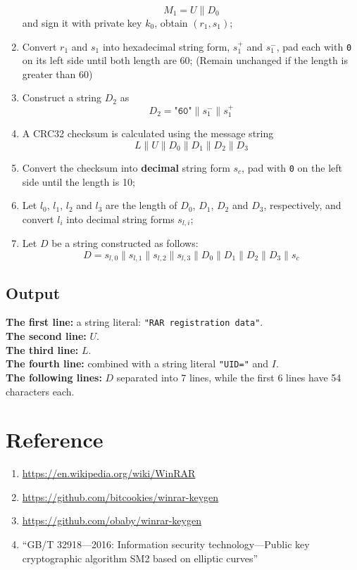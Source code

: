 \documentclass[oneside]{article}
\begin{document}
\begin{enumerate}
            \[M_1=U\parallel D_0\]
            and sign it with private key $k_0$, obtain $\left(r_1,s_1\right)$;
      \item Convert $r_1$ and $s_1$ into hexadecimal string form, $s_1^+$ and $s_1^-$, pad each with \texttt{0} on its left side until both length are 60; (Remain unchanged if the length is greater than 60)
      \item Construct a string $D_2$ as
            \[D_2=\texttt{"60"}\parallel s_1^-\parallel s_1^+\]
      \item A CRC32 checksum is calculated using the message string
            \[L\parallel U\parallel D_0\parallel D_1\parallel D_2\parallel D_3\]
      \item Convert the checksum into \textbf{decimal} string form $s_c$, pad with \texttt{0} on the left side until the length is 10;
      \item Let $l_0$, $l_1$, $l_2$ and $l_3$ are the length of $D_0$, $D_1$, $D_2$ and $D_3$, respectively, and convert $l_i$ into decimal string forms $s_{l,i}$;
      \item Let $D$ be a string constructed as follows:
            \[D=s_{l,0}\parallel s_{l,1}\parallel s_{l,2}\parallel s_{l,3}\parallel D_0\parallel D_1\parallel D_2\parallel D_3 \parallel s_c\]
\end{enumerate}

\subsection{Output}
\textbf{The first line:} a string literal: \texttt{"RAR registration data"}.\\
\textbf{The second line:} $U$.\\
\textbf{The third line:} $L$.\\
\textbf{The fourth line:} combined with a string literal \texttt{"UID="} and $I$.\\
\textbf{The following lines:} $D$ separated into 7 lines, while the first 6 lines have 54 characters each.

\section*{Reference}
\begin{enumerate}
      \item \url{https://en.wikipedia.org/wiki/WinRAR}
      \item \url{https://github.com/bitcookies/winrar-keygen}
      \item \url{https://github.com/obaby/winrar-keygen}
      \item ``GB/T 32918—2016: Information security technology—Public key cryptographic algorithm SM2 based on elliptic curves''
\end{enumerate}
\end{document}
